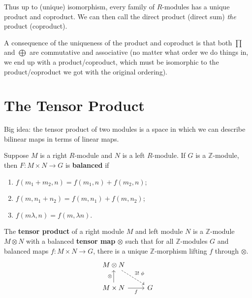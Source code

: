 \documentclass[twoside,10pt]{report}
\begin{document}
\begin{note}[]
	Thus up to (unique) isomorphism, every family of $R$-modules has a unique product and coproduct. We can then call the direct product (direct sum) \textit{the} product (coproduct).
\end{note}


A consequence of the uniqueness of the product and coproduct is that both $\prod$ and $\bigoplus$ are commutative and associative (no matter what order we do things in, we end up with a product/coproduct, which must be isomorphic to the product/coproduct we got with the original ordering).



\section{The Tensor Product}


\begin{note}[]
Big idea: the tensor product of two modules is a space in which we can describe bilinear maps in terms of linear maps.
\end{note}

\begin{defn}[]
Suppose $M$ is a right $R$-module and $N$ is a left $R$-module. If $G$ is a $\mathbb{Z}$-module, then $F:M\times N\to G$ is \textbf{balanced} if
\begin{enumerate}
	\item $f(m_1+m_2,n)=f(m_1,n)+f(m_2,n)$;
	\item $f(m,n_1+n_2)=f(m,n_1)+f(m,n_2)$;
	\item $f(m \lambda,n)=f(m,\lambda n)$.
\end{enumerate}
\end{defn}

\begin{defn}[]
The \textbf{tensor product} of a right module $M$ and left module $N$ is a $\mathbb{Z}$-module $M \otimes N$ with a balanced \textbf{tensor map} $\otimes$ such that for all $\mathbb{Z}$-modules $G$ and balanced maps $f:M\times N\to G$, there is a unique $\mathbb{Z}$-morphism lifting $f$ through $\otimes$.
\[
\begin{tikzcd}
	M\otimes N \arrow[dr,dashed,"\exists!\;\phi"] \\
	M\times N \uar{\otimes}\rar["f"'] & G
\end{tikzcd}
\]
\end{defn}
\end{document}
